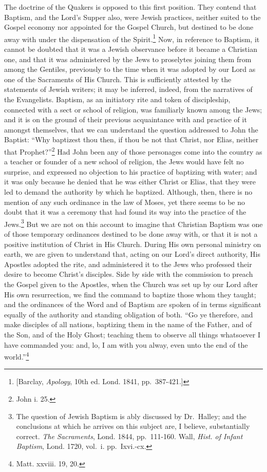 \documentclass[english,]{book}
\begin{document}
The doctrine of the Quakers is opposed to this first position. They contend that Baptism, and the Lord's Supper also, were Jewish practices, neither suited to the Gospel economy nor appointed for the Gospel Church, but destined to be done away with under the dispensation of the Spirit.\footnote{{[}Barclay, \emph{Apology}, 10th ed. Lond. 1841, pp.~387-421.{]}} Now, in reference to Baptism, it cannot be doubted that it was a Jewish observance before it became a Christian one, and that it was administered by the Jews to proselytes joining them from among the Gentiles, previously to the time when it was adopted by our Lord as one of the Sacraments of His Church. This is sufficiently attested by the statements of Jewish writers; it may be inferred, indeed, from the narratives of the Evangelists. Baptism, as an initiatory rite and token of discipleship, connected with a sect or school of religion, was familiarly known among the Jews; and it is on the ground of their previous acquaintance with and practice of it amongst themselves, that we can understand the question addressed to John the Baptist: ``Why baptizest thou then, if thou be not that Christ, nor Elias, neither that Prophet?''\footnote{John i. 25.} Had John been any of those personages come into the country as a teacher or founder of a new school of religion, the Jews would have felt no surprise, and expressed no objection to his practice of baptizing with water; and it was only because he denied that he was either Christ or Elias, that they were led to demand the authority by which he baptized. Although, then, there is no mention of any such ordinance in the law of Moses, yet there seems to be no doubt that it was a ceremony that had found its way into the practice of the Jews.\footnote{The question of Jewish Baptism is ably discussed by Dr.~Halley; and the conclusions at which he arrives on this subject are, I believe, substantially correct. \emph{The Sacraments}, Lond. 1844, pp.~111-160. Wall, \emph{Hist. of Infant Baptism}, Lond. 1720, vol.~i. pp.~Ixvi.-cx.} But we are not on this account to imagine that Christian Baptism was one of those temporary ordinances destined to be done away with, or that it is not a positive institution of Christ in His Church. During His own personal ministry on earth, we are given to understand that, acting on our Lord's direct authority, His Apostles adopted the rite, and administered it to the Jews who professed their desire to become Christ's disciples. Side by side with the commission to preach the Gospel given to the Apostles, when the Church was set up by our Lord after His own resurrection, we find the command to baptize those whom they taught; and the ordinances of the Word and of Baptism are spoken of in terms significant equally of the authority and standing obligation of both. ``Go ye therefore, and make disciples of all nations, baptizing them in the name of the Father, and of the Son, and of the Holy Ghost; teaching them to observe all things whatsoever I have commanded you: and, lo, I am with you alway, even unto the end of the world.''\footnote{Matt. xxviii. 19, 20.}
\end{document}
